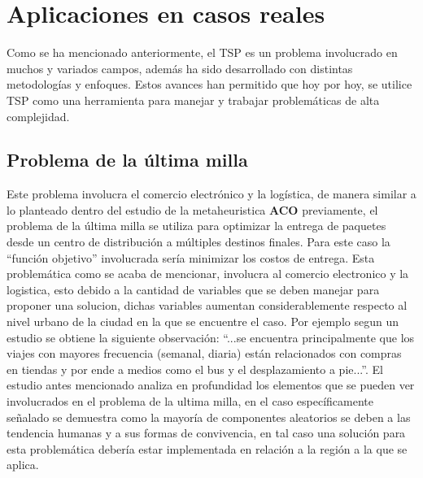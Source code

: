 \titleformat{\chapter}[display]
    {\normalfont\Large\bfseries}{\filleft\chaptertitlename\ \thechapter}{20pt}{\Huge}
 \chapter{Aplicaciones en casos reales}
    Como se ha mencionado anteriormente, el TSP es un problema involucrado en muchos y variados campos, además ha sido desarrollado con distintas metodologías y enfoques.  
    \newline
    \newline
    Estos avances han permitido que hoy por hoy, se utilice TSP como una herramienta para manejar y trabajar problemáticas de alta complejidad. 
    
        \section{Problema de la última milla}
        
            Este problema involucra el comercio electrónico y la logística, de manera similar a lo planteado dentro del estudio de la metaheuristica \textbf{ACO} previamente, el problema de la última milla se utiliza para optimizar la entrega de paquetes desde un centro de distribución a múltiples destinos finales. Para este caso la “función objetivo” involucrada sería minimizar los costos de entrega. 
            \newline
            \newline
            Esta problemática como se acaba de mencionar, involucra al comercio electronico y la logistica, esto debido a la cantidad de variables que se deben manejar para proponer una solucion, dichas variables aumentan considerablemente respecto al nivel urbano de la ciudad en la que se encuentre el caso.
            \newline
            \newline
            Por ejemplo segun un estudio se obtiene la siguiente observación: “...se encuentra principalmente que los viajes con mayores frecuencia (semanal, diaria) están relacionados con compras en tiendas y por ende a medios como el bus y el desplazamiento a pie...”\parencite[p. 10]{ULTIMAMILLACOMPORTAMIENTOS}.
            \newline
            \newline
            El estudio antes mencionado analiza en profundidad los elementos que se pueden ver involucrados en el problema de la ultima milla, en el caso específicamente señalado se demuestra como la mayoría de componentes aleatorios se deben a las tendencia humanas y a sus formas de convivencia, en tal caso una solución para esta problemática debería estar implementada en relación a la región a la que se aplica.
            
